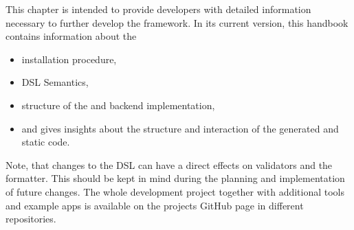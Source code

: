 

This chapter is intended to provide \MD developers with detailed information necessary to further develop the framework.
In its current version, this handbook contains information about the

\begin{itemize}
	\item installation procedure,
	\item DSL Semantics,
	\item structure of the \mapapps and backend implementation,
	\item and  gives insights about the structure and interaction of the generated and static code.
\end{itemize}

Note, that changes to the DSL can have a direct effects on validators and the formatter. This should be kept in mind during the planning and implementation of future changes. The whole development project together with additional tools and example apps is available on the projects GitHub page in different repositories.
